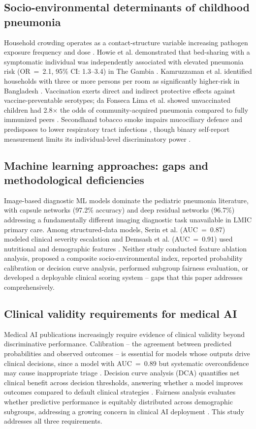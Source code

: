 \documentclass[3p,times,twocolumn]{elsarticle}
\begin{document}
\subsection{Socio-environmental determinants of childhood pneumonia}
Household crowding operates as a contact-structure variable increasing pathogen exposure frequency and dose \cite{ref3,ref6}. Howie et al. demonstrated that bed-sharing with a symptomatic individual was independently associated with elevated pneumonia risk (OR~=~2.1, 95\% CI: 1.3--3.4) in The Gambia \cite{ref9}. Kamruzzaman et al. identified households with three or more persons per room as significantly higher-risk in Bangladesh \cite{ref3}. Vaccination exerts direct and indirect protective effects against vaccine-preventable serotypes; da Fonseca Lima et al. showed unvaccinated children had 2.8$\times$ the odds of community-acquired pneumonia compared to fully immunized peers \cite{ref8}. Secondhand tobacco smoke impairs mucociliary defence and predisposes to lower respiratory tract infections \cite{ref1,ref3,ref7}, though binary self-report measurement limits its individual-level discriminatory power \cite{ref7,ref12}.

\subsection{Machine learning approaches: gaps and methodological deficiencies}
Image-based diagnostic ML models dominate the pediatric pneumonia literature, with capsule networks (97.2\% accuracy) \cite{ref13} and deep residual networks (96.7\%) \cite{ref14} addressing a fundamentally different imaging diagnostic task unavailable in LMIC primary care. Among structured-data models, Serin et al. (AUC~=~0.87) modeled clinical severity escalation \cite{ref4} and Demsash et al. (AUC~=~0.91) used nutritional and demographic features \cite{ref6}. Neither study conducted feature ablation analysis, proposed a composite socio-environmental index, reported probability calibration or decision curve analysis, performed subgroup fairness evaluation, or developed a deployable clinical scoring system -- gaps that this paper addresses comprehensively.

\subsection{Clinical validity requirements for medical AI}
Medical AI publications increasingly require evidence of clinical validity beyond discriminative performance. Calibration -- the agreement between predicted probabilities and observed outcomes -- is essential for models whose outputs drive clinical decisions, since a model with AUC~=~0.89 but systematic overconfidence may cause inappropriate triage \cite{ref5}. Decision curve analysis (DCA) quantifies net clinical benefit across decision thresholds, answering whether a model improves outcomes compared to default clinical strategies \cite{ref4}. Fairness analysis evaluates whether predictive performance is equitably distributed across demographic subgroups, addressing a growing concern in clinical AI deployment \cite{ref11}. This study addresses all three requirements.
\end{document}
